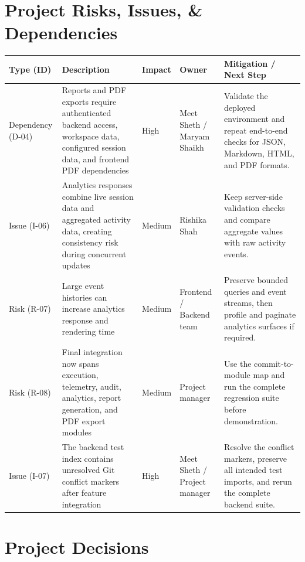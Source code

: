 \documentclass[11pt,a4paper]{article}
\begin{document}
\section{Project Risks, Issues, \& Dependencies}

\small
\begin{tabularx}{\textwidth}{p{1.35cm} Y p{1.2cm} p{1.45cm} Y}
\toprule
\textbf{Type (ID)} & \textbf{Description} & \textbf{Impact} & \textbf{Owner} & \textbf{Mitigation / Next Step} \\
\midrule
Dependency (D-04) & Reports and PDF exports require authenticated backend access, workspace data, configured session data, and frontend PDF dependencies & High & Meet Sheth / Maryam Shaikh & Validate the deployed environment and repeat end-to-end checks for JSON, Markdown, HTML, and PDF formats. \\
Issue (I-06) & Analytics responses combine live session data and aggregated activity data, creating consistency risk during concurrent updates & Medium & Rishika Shah & Keep server-side validation checks and compare aggregate values with raw activity events. \\
Risk (R-07) & Large event histories can increase analytics response and rendering time & Medium & Frontend / Backend team & Preserve bounded queries and event streams, then profile and paginate analytics surfaces if required. \\
Risk (R-08) & Final integration now spans execution, telemetry, audit, analytics, report generation, and PDF export modules & Medium & Project manager & Use the commit-to-module map and run the complete regression suite before demonstration. \\
Issue (I-07) & The backend test index contains unresolved Git conflict markers after feature integration & High & Meet Sheth / Project manager & Resolve the conflict markers, preserve all intended test imports, and rerun the complete backend suite. \\
\bottomrule
\end{tabularx}
\normalsize

\section{Project Decisions}
\end{document}
